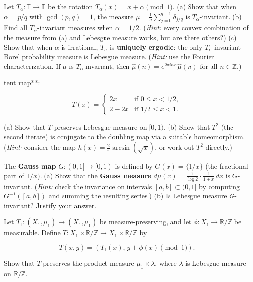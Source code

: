 \begin{exercise}
Let $T_\alpha: \mathbb{T} \to \mathbb{T}$ be the rotation $T_\alpha(x) = x + \alpha \pmod{1}$.
(a) Show that when $\alpha = p/q$ with $\gcd(p,q) = 1$, the measure $\mu = \frac{1}{q}\sum_{j=0}^{q-1} \delta_{j/q}$ is $T_\alpha$-invariant.
(b) Find all $T_\alpha$-invariant measures when $\alpha = 1/2$. (\textit{Hint:} every convex combination of the measure from (a) and Lebesgue measure works, but are there others?)
(c) Show that when $\alpha$ is irrational, $T_\alpha$ is \textbf{uniquely ergodic}: the only $T_\alpha$-invariant Borel probability measure is Lebesgue measure. (\textit{Hint:} use the Fourier characterization. If $\mu$ is $T_\alpha$-invariant, then $\hat{\mu}(n) = e^{2\pi i n\alpha} \hat{\mu}(n)$ for all $n \in \mathbb{Z}$.)
\end{exercise}


\begin{exercise}
tent map**:

\[
T(x) = \begin{cases} 2x & \text{if } 0 \le x < 1/2, \\ 2 - 2x & \text{if } 1/2 \le x < 1. \end{cases}
\]

(a) Show that $T$ preserves Lebesgue measure on $[0,1)$.
(b) Show that $T^2$ (the second iterate) is conjugate to the doubling map via a suitable homeomorphism. (\textit{Hint:} consider the map $h(x) = \frac{2}{\pi}\arcsin(\sqrt{x})$, or work out $T^2$ directly.)
\end{exercise}


\begin{exercise}
The \textbf{Gauss map} $G: (0,1] \to [0,1)$ is defined by $G(x) = \{1/x\}$ (the fractional part of $1/x$).
(a) Show that the \textbf{Gauss measure} $d\mu(x) = \frac{1}{\log 2} \cdot \frac{1}{1+x} \, dx$ is $G$-invariant. (\textit{Hint:} check the invariance on intervals $[a, b] \subset (0,1]$ by computing $G^{-1}([a,b])$ and summing the resulting series.)
(b) Is Lebesgue measure $G$-invariant? Justify your answer.
\end{exercise}


\begin{exercise}
Let $T_1: (X_1, \mu_1) \to (X_1, \mu_1)$ be measure-preserving, and let $\phi: X_1 \to \mathbb{R}/\mathbb{Z}$ be measurable. Define $T: X_1 \times \mathbb{R}/\mathbb{Z} \to X_1 \times \mathbb{R}/\mathbb{Z}$ by

\[
T(x, y) = (T_1(x), \, y + \phi(x) \pmod{1}).
\]

Show that $T$ preserves the product measure $\mu_1 \times \lambda$, where $\lambda$ is Lebesgue measure on $\mathbb{R}/\mathbb{Z}$.
\end{exercise}


